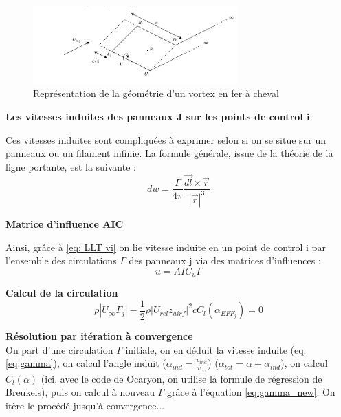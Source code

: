 \begin{figure}[H]
    \centering
    \includegraphics[width=0.7\textwidth]{Pics/01 - Basses Fidélités/Panneaux VSM.png}
    \caption{Représentation de la géométrie d'un vortex en fer à cheval}
    \label{fig:panneau vsm}
\end{figure}

\textbf{Les vitesses induites des panneaux J sur les points de control i}

Ces vitesses induites sont compliquées à exprimer selon si on se situe sur un panneaux ou un filament infinie. La formule générale, issue de la théorie de la ligne portante, est la suivante : 
\begin{equation}
    dw = \frac{\Gamma}{4 \pi} \frac{\overrightarrow{dl} \times \overrightarrow{r}}{|\overrightarrow{r}|^3}
    \label{eq: LLT vi}
\end{equation}

\textbf{Matrice d'influence AIC}

Ainsi, grâce à \ref{eq: LLT vi} on lie vitesse induite en un point de control i par l'ensemble des circulations $\Gamma$ des panneaux j via des matrices d'influences : 
\begin{equation}
    u = AIC_u \Gamma
    \label{eq:gamma}
\end{equation}

\textbf{Calcul de la circulation}
\begin{equation}
    \rho |U_{\infty} \Gamma_j| - \frac{1}{2} \rho |U_{rel} z_{airf}|^2 c C_l(\alpha_{EFF_j}) = 0
    \label{eq:gamma_new}
\end{equation}

\textbf{Résolution par itération à convergence}\\
On part d'une circulation $\Gamma$ initiale, on en déduit la vitesse induite (eq. \ref{eq:gamma}), on calcul l'angle induit ($\alpha_{ind} = \frac{v_{ind}}{v_{\infty}}$) ($\alpha_{tot} = \alpha + \alpha_{ind}$), on calcul $C_l(\alpha)$ (ici, avec le code de Ocaryon, on utilise la formule de régression de Breukels), puis on calcul à nouveau $\Gamma$ grâce à l'équation \ref{eq:gamma_new}. On itère le procédé jusqu'à convergence...\\


